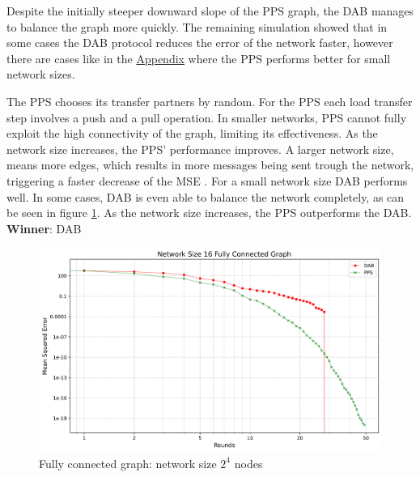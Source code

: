 Despite the initially steeper downward slope of the PPS graph, the DAB manages to balance the graph more quickly. The remaining simulation showed that in some cases the DAB protocol reduces the error of the network faster, however there are cases like in the \hyperref[chap:appendix]{Appendix} where the PPS performs better for small network sizes.

The PPS chooses its transfer partners by random. For the PPS each load transfer step involves a push and a pull operation. In smaller networks, PPS cannot fully exploit the high connectivity of the graph, limiting its effectiveness. As the network size increases, the PPS' performance improves. A larger network size, means more edges, which results in more messages being sent trough the network, triggering a faster decrease of the MSE \cite{nugroho2023PushPullSumDataAg}. For a small network size DAB performs well. In some cases, DAB is even able to balance the network completely, as can be seen in figure \ref{fig:16CompleteGraph}. As the network size increases, the PPS outperforms the DAB.\\
\textbf{Winner}: DAB
\begin{figure}[H]
    \centering
    \includegraphics[scale=0.5]{figures/completeGraphSimulations/DAB_vs_PPS_FCG_r50_n16.png}
    \caption{Fully connected graph: network size $2^{4}$ nodes}
    \label{fig:16CompleteGraph}
\end{figure}

